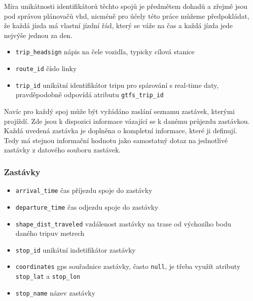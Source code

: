 \bigbreak

Míra unikátnosti identifikátorů těchto spojů je předmětem dohadů a zřejmě jsou pod správou plánovačů \gls{vhd}, nicméně pro účely této práce můžeme předpokládat, že každá jízda má vlastní jízdní řád, který se váže na čas a každá jízda jede nejvýše jednou za den.

\begin{itemize}
	\item \verb-trip_headsign- nápis na čele vozidla, typicky cílová stanice

	\item \verb-route_id- číslo linky

	\item \verb-trip_id- unikátní identifikátor tripu pro spárování s real-time daty, pravděpodobně odpovídá atributu \verb"gtfs_trip_id"


\end{itemize}

Navíc pro každý spoj může být vyžádáno zaslání seznamu zastávek, kterými projíždí. Zde jsou k dispozici informace vázající se k danému průjezdu zastávkou. Každá uvedená zastávka je doplněna o kompletní informace, které ji definují. Tedy má stejnou informační hodnotu jako samostatný dotaz na jednotlivé zastávky z datového souboru zastávek.

\subsubsection{Zastávky}

\begin{itemize}
	\item \verb-arrival_time- čas příjezdu spoje do zastávky

	\item \verb-departure_time- čas odjezdu spoje do zastávky

	\item \verb-shape_dist_traveled- vzdálenost zastávky na trase od výchozího bodu daného tripuv metrech

	\item \verb-stop_id- unikátní indetifikátor zastávky

	\item \verb-coordinates- \gls{gps} souřadnice zastávky, často \verb"null", je třeba využít atributy \verb"stop_lat" a \verb"stop_lon"

	\item \verb-stop_name- název zastávky
\end{itemize}

